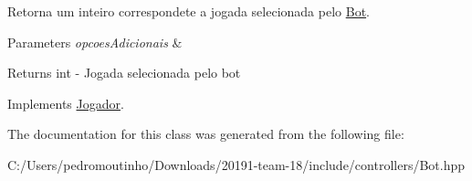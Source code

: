 Retorna um inteiro correspondete a jogada selecionada pelo \mbox{\hyperlink{class_bot}{Bot}}. 


\begin{DoxyParams}{Parameters}
{\em opcoes\+Adicionais} & \\
\hline
\end{DoxyParams}
\begin{DoxyReturn}{Returns}
int -\/ Jogada selecionada pelo bot 
\end{DoxyReturn}


Implements \mbox{\hyperlink{class_jogador}{Jogador}}.



The documentation for this class was generated from the following file\+:\begin{DoxyCompactItemize}
\item 
C\+:/\+Users/pedromoutinho/\+Downloads/20191-\/team-\/18/include/controllers/Bot.\+hpp\end{DoxyCompactItemize}
